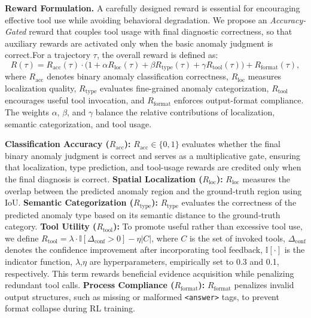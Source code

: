 \documentclass{article}
\begin{document}
\textbf{Reward Formulation.}
A carefully designed reward is essential for encouraging effective tool use while avoiding behavioral degradation. 
We propose an \emph{Accuracy-Gated} reward that couples tool usage with final diagnostic correctness, so that auxiliary rewards are activated only when the basic anomaly judgment is correct.For a trajectory $\tau$, the overall reward is defined as:
\begin{equation}
R(\tau) =
R_{\text{acc}}(\tau)
\cdot
\Big(
1 + \alpha R_{\text{loc}}(\tau)
+ \beta R_{\text{type}}(\tau)
+ \gamma R_{\text{tool}}(\tau)
\Big)
+
R_{\text{format}}(\tau),
\end{equation}
where $R_{\text{acc}}$ denotes binary anomaly classification correctness, $R_{\text{loc}}$ measures localization quality, $R_{\text{type}}$ evaluates fine-grained anomaly categorization, $R_{\text{tool}}$ encourages useful tool invocation, and $R_{\text{format}}$ enforces output-format compliance. 
The weights $\alpha$, $\beta$, and $\gamma$ balance the relative contributions of localization, semantic categorization, and tool usage.

 \textbf{Classification Accuracy ($R_{\text{acc}}$):} $R_{\text{acc}} \in \{0,1\}$ evaluates whether the final binary anomaly judgment is correct and serves as a multiplicative gate, ensuring that localization, type prediction, and tool-usage rewards are credited only when the final diagnosis is correct.  \textbf{Spatial Localization ($R_{\text{loc}}$):} $R_{\text{loc}}$ measures the overlap between the predicted anomaly region and the ground-truth region using IoU.  \textbf{Semantic Categorization ($R_{\text{type}}$):} $R_{\text{type}}$ evaluates the correctness of the predicted anomaly type based on its semantic distance to the ground-truth category.  \textbf{Tool Utility ($R_{\text{tool}}$):} To promote useful rather than excessive tool use, we define $R_{\text{tool}}=\lambda \cdot \mathbb{I}[\Delta_{\text{conf}}>0]-\eta|C|$, where $C$ is the set of invoked tools, $\Delta_{\text{conf}}$ denotes the confidence improvement after incorporating tool feedback, $\mathbb{I}[\cdot]$ is the indicator function, $\lambda$,$\eta$ are hyperparameters, empirically set to 0.3 and 0.1, respectively. This term rewards beneficial evidence acquisition while penalizing redundant tool calls.  \textbf{Process Compliance ($R_{\text{format}}$):} $R_{\text{format}}$ penalizes invalid output structures, such as missing or malformed \texttt{<answer>} tags, to prevent format collapse during RL training.
\end{document}
